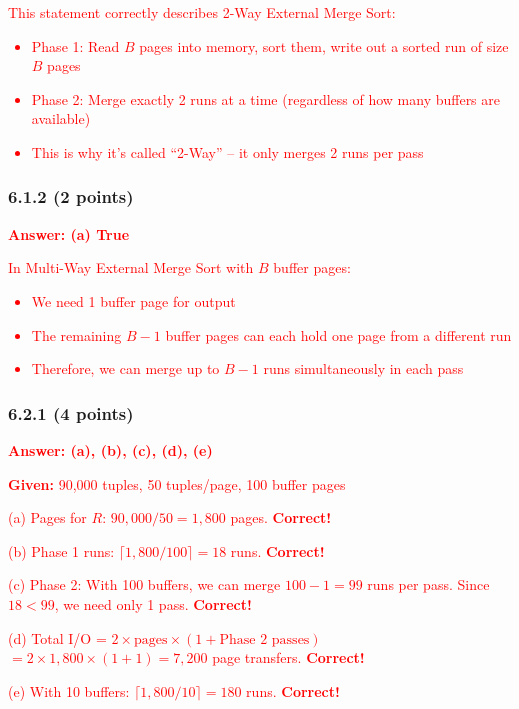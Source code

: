 \documentclass[11pt,a4paper]{article}
\begin{document}
\textcolor{red}{This statement correctly describes 2-Way External Merge Sort:}
\textcolor{red}{\begin{itemize}
\item Phase 1: Read $B$ pages into memory, sort them, write out a sorted run of size $B$ pages
\item Phase 2: Merge exactly 2 runs at a time (regardless of how many buffers are available)
\item This is why it's called ``2-Way'' -- it only merges 2 runs per pass
\end{itemize}}

\subsubsection*{6.1.2 (2 points)}
\textcolor{red}{\textbf{Answer: (a) True}}

\textcolor{red}{In Multi-Way External Merge Sort with $B$ buffer pages:}
\textcolor{red}{\begin{itemize}
\item We need 1 buffer page for output
\item The remaining $B-1$ buffer pages can each hold one page from a different run
\item Therefore, we can merge up to $B-1$ runs simultaneously in each pass
\end{itemize}}

\subsubsection*{6.2.1 (4 points)}
\textcolor{red}{\textbf{Answer: (a), (b), (c), (d), (e)}}

\textcolor{red}{\textbf{Given:} 90,000 tuples, 50 tuples/page, 100 buffer pages}

\textcolor{red}{(a) Pages for $R$: $90,000 / 50 = 1,800$ pages. \textbf{Correct!}}

\textcolor{red}{(b) Phase 1 runs: $\lceil 1,800 / 100 \rceil = 18$ runs. \textbf{Correct!}}

\textcolor{red}{(c) Phase 2: With 100 buffers, we can merge $100-1=99$ runs per pass. Since $18 < 99$, we need only 1 pass. \textbf{Correct!}}

\textcolor{red}{(d) Total I/O = $2 \times \text{pages} \times (1 + \text{Phase 2 passes})$}
\textcolor{red}{$= 2 \times 1,800 \times (1 + 1) = 7,200$ page transfers. \textbf{Correct!}}

\textcolor{red}{(e) With 10 buffers: $\lceil 1,800 / 10 \rceil = 180$ runs. \textbf{Correct!}}
\end{document}
